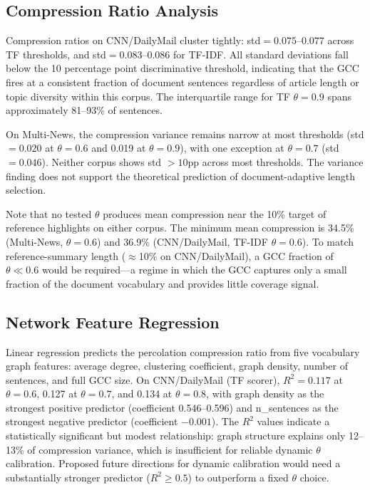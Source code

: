 \documentclass[11pt,letterpaper]{article}
\begin{document}
\subsection{Compression Ratio Analysis}
\label{sec:compression}

Compression ratios on CNN/DailyMail cluster tightly: std$=0.075$--$0.077$ across TF
thresholds, and std$=0.083$--$0.086$ for TF-IDF. All standard deviations fall below the
10 percentage point discriminative threshold, indicating that the GCC fires at a
consistent fraction of document sentences regardless of article length or topic diversity
within this corpus. The interquartile range for TF $\theta{=}0.9$ spans approximately
81--93\% of sentences.

On Multi-News, the compression variance remains narrow at most thresholds
(std$=0.020$ at $\theta{=}0.6$ and 0.019 at $\theta{=}0.9$), with one exception at
$\theta{=}0.7$ (std$=0.046$). Neither corpus shows std $> 10$pp across most thresholds.
The variance finding does not support the theoretical prediction of document-adaptive
length selection.

Note that no tested $\theta$ produces mean compression near the 10\% target of reference
highlights on either corpus. The minimum mean compression is 34.5\% (Multi-News,
$\theta{=}0.6$) and 36.9\% (CNN/DailyMail, TF-IDF $\theta{=}0.6$). To match
reference-summary length ($\approx$10\% on CNN/DailyMail), a GCC fraction of
$\theta\ll 0.6$ would be required---a regime in which the GCC captures only a small
fraction of the document vocabulary and provides little coverage signal.

\subsection{Network Feature Regression}
\label{sec:regression}

Linear regression predicts the percolation compression ratio from five vocabulary graph
features: average degree, clustering coefficient, graph density, number of sentences, and
full GCC size. On CNN/DailyMail (TF scorer), $R^2=0.117$ at $\theta{=}0.6$, 0.127 at
$\theta{=}0.7$, and 0.134 at $\theta{=}0.8$, with graph density as the strongest
positive predictor (coefficient 0.546--0.596) and n\_sentences as the strongest negative
predictor (coefficient $-0.001$). The $R^2$ values indicate a statistically significant
but modest relationship: graph structure explains only 12--13\% of compression variance,
which is insufficient for reliable dynamic $\theta$ calibration. Proposed future
directions for dynamic calibration would need a substantially stronger predictor
($R^2\ge 0.5$) to outperform a fixed $\theta$ choice.
\end{document}
